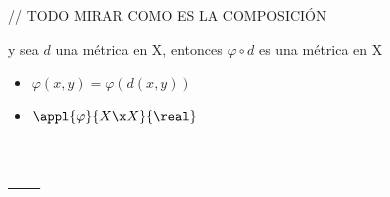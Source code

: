 \documentclass[palatino]{apuntes}
\begin{document}
// TODO MIRAR COMO ES LA COMPOSICIÓN

y sea $ d $ una métrica en X, entonces $ \varphi \circ d $ es una métrica en X

\begin{itemize}
	\item $ \varphi(x,y)= \varphi (d(x,y)) $
	\item $ \appl{\varphi}{X \x X}{\real} $
\end{itemize}

\appendix

\chapter{---}


\printindex
\end{document}
